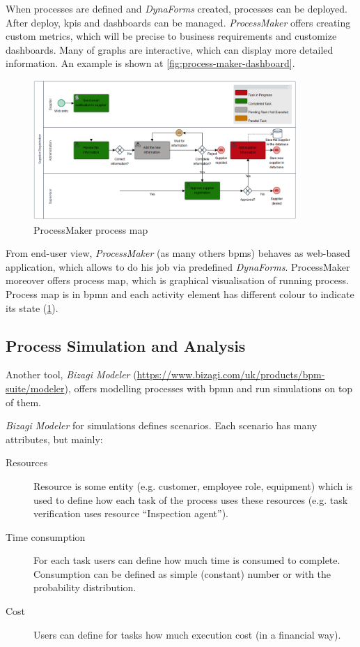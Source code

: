  When processes are defined and \textit{DynaForms} created, processes can be deployed. After deploy, \gls{kpi}s and dashboards can be managed. \textit{ProcessMaker} offers creating custom metrics, which will be precise to business requirements and customize dashboards. Many of graphs are interactive, which can display more detailed information. An example is shown at \cref{fig:process-maker-dashboard}.
 
 \begin{figure}[ht!]
	\centering
    \includegraphics[width=10cm, keepaspectratio]{img/process-maker-map.PNG}
    \caption{ProcessMaker process map}
    \label{fig:process-maker-process-map}
\end{figure} 
 
 From end-user view, \textit{ProcessMaker} (as many others \gls{bpms}) behaves as web-based application, which allows to do his job via predefined \textit{DynaForms}. ProcessMaker moreover offers process map, which is graphical visualisation of running process. Process map is in \gls{bpmn} and each activity element has different colour to indicate its state (\cref{fig:process-maker-process-map}).
 
\subsection{Process Simulation and Analysis}
Another tool, \textit{Bizagi Modeler} (\href{https://www.bizagi.com/uk/products/bpm-suite/modeler}{https://www.bizagi.com/uk/products/bpm-suite/modeler}), offers modelling processes with \gls{bpmn} and run simulations on top of them.

\textit{Bizagi Modeler} for simulations defines scenarios. Each scenario has many attributes, but mainly:
\begin{description}
    \item[Resources] Resource is some entity (e.g. customer, employee role, equipment) which is used to define how each task of the process uses these resources (e.g. task verification uses resource ``Inspection agent'').
    \item[Time consumption] For each task users can define how much time is consumed to complete. Consumption can be defined as simple (constant) number or with the probability distribution.
    \item[Cost] Users can define for tasks how much execution cost (in a financial way).    
\end{description}

